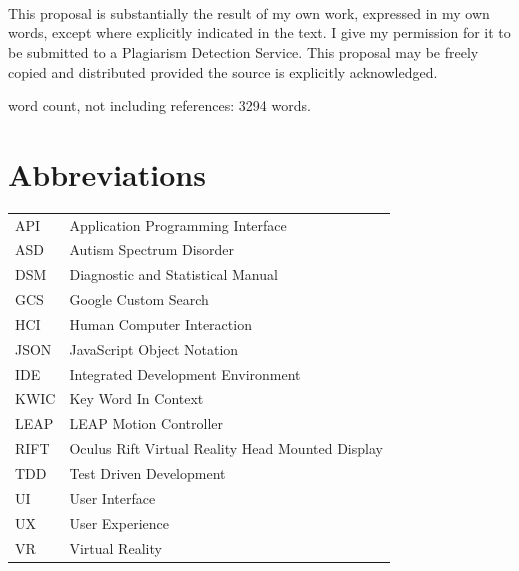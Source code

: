 \documentclass[a4paper, 11pt]{article}
\begin{document}
\begin{verbatim}














\end{verbatim}
\begin{justify}
This proposal is substantially the result of my own work, expressed in my own words, except where explicitly indicated in the text. I give my permission for it to be submitted to a Plagiarism Detection Service. This proposal may be freely copied and distributed provided the source is explicitly acknowledged.

\begin{center}
word count, not including references: 3294 words.
\end{center}

\clearpage
\tableofcontents
\clearpage

\section*{Abbreviations}
\begin{tabular}{l l }
API & Application Programming Interface\\
ASD & Autism Spectrum Disorder\\
DSM & Diagnostic and Statistical Manual\\
GCS & Google Custom Search\\
HCI & Human Computer Interaction\\
JSON & JavaScript Object Notation\\
IDE & Integrated Development Environment\\
KWIC & Key Word In Context\\
LEAP & LEAP Motion Controller\\
RIFT & Oculus Rift Virtual Reality Head Mounted Display\\
TDD & Test Driven Development\\
UI & User Interface\\
UX & User Experience\\
VR & Virtual Reality\\
\end{tabular}


\end{justify}
\end{document}
